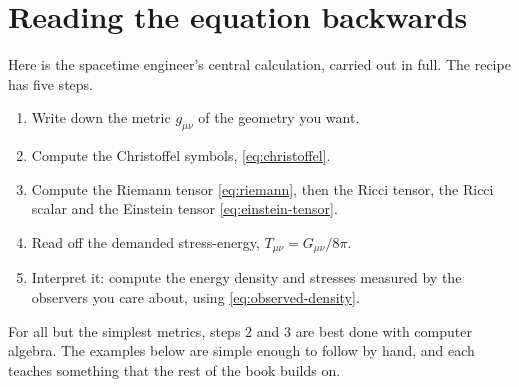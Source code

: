 \section{Reading the equation backwards}\label{sec:backwards}

Here is the spacetime engineer's central calculation, carried out in full. The
recipe has five steps.
\begin{enumerate}
\item Write down the metric $g_{\mu\nu}$ of the geometry you want.
\item Compute the Christoffel symbols, \cref{eq:christoffel}.
\item Compute the Riemann tensor \cref{eq:riemann}, then the Ricci tensor, the
  Ricci scalar and the Einstein tensor \cref{eq:einstein-tensor}.
\item Read off the demanded stress-energy, $T_{\mu\nu} = G_{\mu\nu}/8\pi$.
\item Interpret it: compute the energy density and stresses measured by the
  observers you care about, using \cref{eq:observed-density}.
\end{enumerate}
For all but the simplest metrics, steps 2 and 3 are best done with computer
algebra. The examples below are simple enough to follow by hand, and each
teaches something that the rest of the book builds on.

